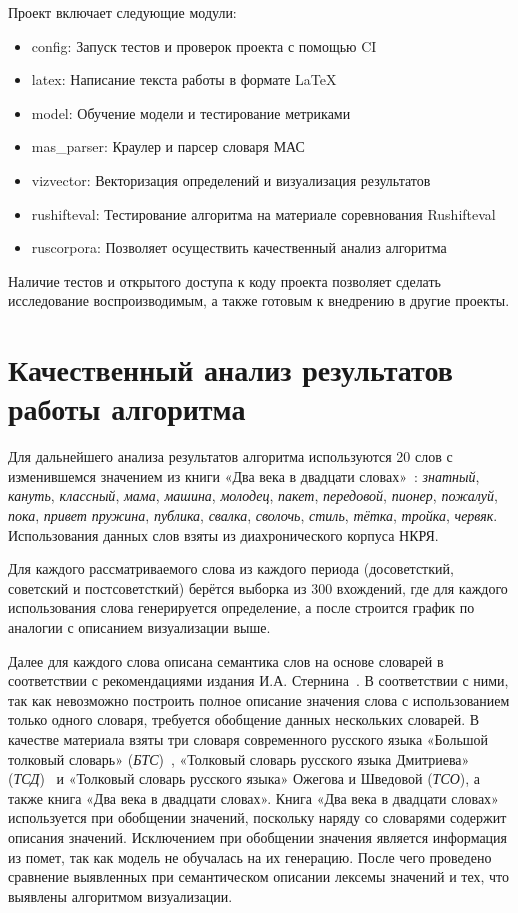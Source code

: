 \documentclass[LI,VKR]{HSEUniversity}
\begin{document}
Проект включает следующие модули:
\begin{itemize}
    \item config: Запуск тестов и проверок проекта с помощью CI
    \item latex: Написание текста работы в формате LaTeX
    \item model: Обучение модели и тестирование метриками
    \item mas\_parser: Краулер и парсер словаря МАС
    \item vizvector: Векторизация определений и визуализация результатов
    \item rushifteval: Тестирование алгоритма на материале соревнования Rushifteval
    \item ruscorpora: Позволяет осуществить качественный анализ алгоритма
\end{itemize}

Наличие тестов и открытого доступа к коду проекта позволяет
сделать исследование воспроизводимым, а также готовым к внедрению в другие проекты.

\section{Качественный анализ результатов работы алгоритма}

Для дальнейшего анализа результатов алгоритма используются 20 слов с изменившемся
значением из книги «Два века в двадцати словах»~\cite{TwoCenturies}:
\textit{знатный}, \textit{кануть}, \textit{классный}, \textit{мама}, \textit{машина}, \textit{молодец},
\textit{пакет}, \textit{передовой}, \textit{пионер}, \textit{пожалуй}, \textit{пока}, \textit{привет}
\textit{пружина}, \textit{публика}, \textit{свалка}, \textit{сволочь},
\textit{стиль}, \textit{тётка}, \textit{тройка}, \textit{червяк}.
Использования данных слов взяты из диахронического корпуса НКРЯ.

Для каждого рассматриваемого слова из каждого периода (досоветсткий, советский и постсоветсткий)
берётся выборка из 300 вхождений,
где для каждого использования слова генерируется определение, а после строится график по аналогии с
описанием визуализации выше.

Далее для каждого слова описана семантика слов на основе словарей в соответствии
с рекомендациями издания И.А. Стернина~\cite{SemanticDefinitionsAndAnalysis}.
В соответствии с ними, так как невозможно построить полное описание значения слова
с использованием только одного словаря, требуется обобщение данных нескольких словарей.
В качестве материала взяты три словаря современного русского языка
«Большой толковый словарь» (\textit{БТС})~\cite{TolkovyKuznetsov},
«Толковый словарь русского языка Дмитриева» (\textit{ТСД})~\cite{TolkovyDmitriev} и
«Толковый словарь русского языка» Ожегова и Шведовой (\textit{ТСО}),
а также книга «Два века в двадцати словах».
Книга «Два века в двадцати словах» используется при обобщении значений,
поскольку наряду со словарями содержит описания значений.
Исключением при обобщении значения является информация из помет,
так как модель не обучалась на их генерацию.
После чего проведено сравнение выявленных при семантическом описании лексемы
значений и тех, что выявлены алгоритмом визуализации.
\end{document}

